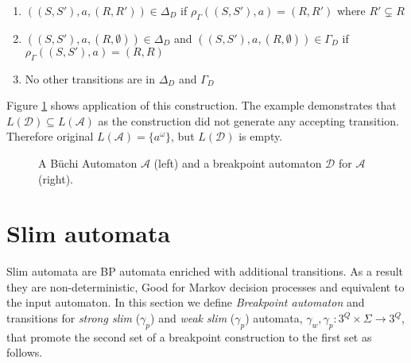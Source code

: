 \documentclass[
	digital
nolof, nolot
]{fithesis3}
\newcommand{\cA}{\mathcal{A}}
\newcommand{\cD}{\mathcal{D}}
\newcommand{\lA}{L(\cA)}
\newcommand{\lD}{L(\cD)}
\newcommand{\flushed}{\text{\emoji{flushed}}}
\newcommand{\hell}{\text{\emoji{fire}}}
\newcommand{\heaven}{\text{\emoji{innocent}}}
\begin{document}
			\begin{enumerate}
				\item $((S, S'), a, (R, R')) \in \Delta_D$ if $\rho_\Gamma((S,S'),a)=(R,R')$ where $R' \subsetneq R$
				\item $((S, S'), a, (R, \emptyset)) \in \Delta_D$ and $((S, S'), a, (R, \emptyset)) \in \Gamma_D$ if $\rho_\Gamma((S,S'),a)=(R,R)$ 
				\item No other transitions are in $\Delta_D$ and $\Gamma_D$
			\end{enumerate}
			
			Figure \ref{fig:bp:non-equivalent} shows application of this construction. The example demonstrates that $\lD \subseteq \lA$ as the construction did not generate any accepting transition. Therefore original $\lA=\{a^\omega\}$, but $\lD$ is empty.
			
			
			
			\begin{figure}[ht]
				\begin{center}
				\end{center}
				\caption{A Büchi Automaton $\cA$ (left) and a breakpoint automaton $\cD$ for $\cA$ (right). }
				\label{fig:bp:non-equivalent}
			\end{figure}
		
			\section{Slim automata}
			Slim automata are BP automata enriched with additional transitions. As a result they are non-deterministic, Good for Markov decision processes \cite{hlavni} and equivalent to the input automaton.	
			In this section we define \emph{Breakpoint automaton} and transitions for \emph{strong slim} ($\gamma_{p}$) and \emph{weak slim} ($\gamma_{p}$) automata,
			 $\gamma_w, \gamma_p:3^Q \times \Sigma \rightarrow 3^Q$, that promote the second set of a breakpoint construction to the first set as follows. 
			
\end{document}
